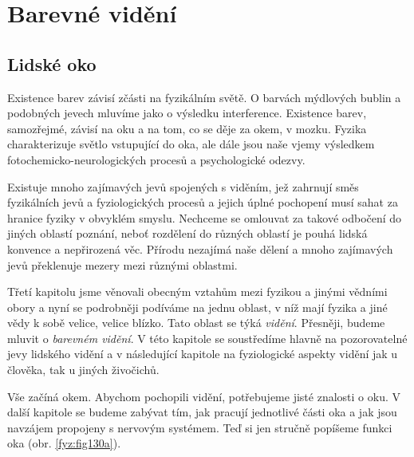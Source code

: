 {
\chapter{Barevné vidění}\label{fyz:IchapXXXV}
\minitoc
  \section{Lidské oko}\label{fyz:IchapXXXVsecI}
    Existence barev závisí zčásti na fyzikálním světě. O barvách mýdlových bublin a podobných 
    jevech mluvíme jako o výsledku interference. Existence barev, samozřejmé, závisí na oku a na 
    tom, co se děje za okem, v mozku. Fyzika charakterizuje světlo vstupující do oka, ale dále jsou 
    naše vjemy výsledkem fotochemicko-neurologických procesů a psychologické odezvy.
    
    Existuje mnoho zajímavých jevů spojených s viděním, jež zahrnují směs fyzikálních jevů a 
    fyziologických procesů a jejich úplné pochopení musí sahat za hranice fyziky v obvyklém smyslu. 
    Nechceme se omlouvat za takové odbočení do jiných oblastí poznání, neboť rozdělení do různých 
    oblastí je pouhá lidská konvence a nepřirozená věc. Přírodu nezajímá naše dělení a mnoho 
    zajímavých jevů překlenuje mezery mezi různými oblastmi.
   
    Třetí kapitolu jsme věnovali obecným vztahům mezi fyzikou a jinými vědními obory a nyní se 
    podrobněji podíváme na jednu oblast, v níž mají fyzika a jiné vědy k sobě velice, velice 
    blízko. Tato oblast se týká \emph{vidění}. Přesněji, budeme mluvit o \emph{barevném vidění}. V 
    této kapitole se soustředíme hlavně na pozorovatelné jevy lidského vidění a v následující 
    kapitole na fyziologické aspekty vidění jak u člověka, tak u jiných živočichů.
    
    Vše začíná okem. Abychom pochopili vidění, potřebujeme jisté znalosti o oku. V další kapitole 
    se budeme zabývat tím, jak pracují jednotlivé části oka a jak jsou navzájem propojeny s 
    nervovým systémem. Teď si jen stručně popíšeme funkci oka (obr. \ref{fyz:fig130a}).

}
